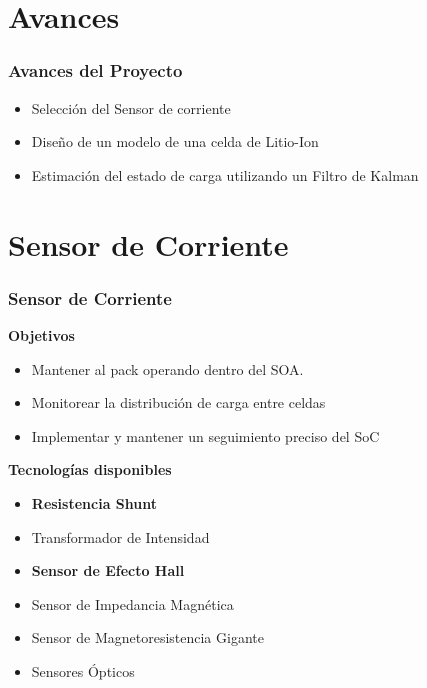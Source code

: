 \documentclass[10pt]{beamer}
\theoremstyle{remark}
\theoremstyle{definition}
\begin{document}
\section{Avances}
\begin{frame}[allowframebreaks]
  \frametitle{Avances del Proyecto}
  \begin{itemize}
	\item Selección del Sensor de corriente
	\item Diseño de un modelo de una celda de Litio-Ion
	\item Estimación del estado de carga utilizando un Filtro de Kalman
  \end{itemize}
\end{frame}

\section{Sensor de Corriente}

\begin{frame}[allowframebreaks]
  \frametitle{Sensor de Corriente}
  \begin{minipage}{0.4\textwidth}
	\textbf{Objetivos}
	\small
	\begin{itemize}
	  \item Mantener al pack operando dentro del SOA.
	  \item Monitorear la distribución de carga entre celdas
	  \item Implementar y mantener un seguimiento preciso del SoC
	  \vspace{4\baselineskip}
	\end{itemize}
  \end{minipage}
  \hfill
  \begin{minipage}{0.4\textwidth}
	\textbf{Tecnologías disponibles}
	\small
	\begin{itemize}
	  \item \textbf{Resistencia Shunt}
	  \item Transformador de Intensidad
	  \item \textbf{Sensor de Efecto Hall}
	  \item Sensor de Impedancia Magnética
	  \item Sensor de Magnetoresistencia Gigante
	  \item Sensores Ópticos
	\end{itemize}
  \end{minipage}
  
\end{frame}
\end{document}

